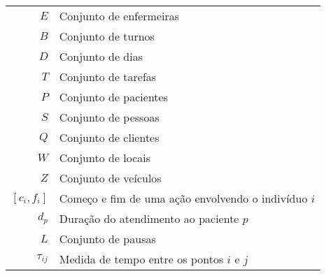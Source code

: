 
\begin{tabular}{rl}
$E$ & Conjunto de enfermeiras \\
$B$ & Conjunto de turnos \\
$D$ & Conjunto de dias \\
$T$ & Conjunto de tarefas \\
$P$ & Conjunto de pacientes \\
$S$ & Conjunto de pessoas \\
$Q$ & Conjunto de clientes \\
$W$ & Conjunto de locais \\
$Z$ & Conjunto de veículos \\
$[c_i,f_i]$ & Começo e fim de uma aç\~ ao envolvendo o indiv\'iduo $i$ \\
$d_p$ & Duraç\~ao do atendimento ao paciente $p$ \\
$L$ & Conjunto de pausas \\ 
$\tau_{ij}$ & Medida de tempo entre os pontos $i$ e $j$
\end{tabular}